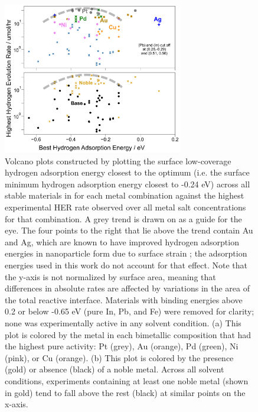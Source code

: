 \documentclass[preprint,12pt]{elsarticle}
\begin{document}
\begin{figure}[h]
\centering
    \includegraphics[width=0.7\textwidth]{figures/fig_4.pdf}
\caption{Volcano plots constructed by plotting the surface low-coverage hydrogen adsorption energy closest to the optimum (i.e. the surface minimum hydrogen adsorption energy closest to -0.24 eV) across all stable materials in for each metal combination against the highest experimental HER rate observed over all metal salt concentrations for that combination. A grey trend is drawn on as a guide for the eye. The four points to the right that lie above the trend contain Au and Ag, which are known to have improved hydrogen adsorption energies in nanoparticle form due to surface strain \cite{tran2018gold,campbell2009hydrogen}; the adsorption energies used in this work do not account for that effect. Note that the y-axis is not normalized by surface area, meaning that differences in absolute rates are affected by variations in the area of the total reactive interface. Materials with binding energies above 0.2 or below -0.65 eV (pure In, Pb, and Fe) were removed for clarity; none was experimentally active in any solvent condition. (a) This plot is colored by the metal in each bimetallic composition that had the highest pure activity: Pt (grey), Au (orange), Pd (green), Ni (pink), or Cu (orange). (b) This plot is colored by the presence (gold) or absence (black) of a noble metal. Across all solvent conditions, experiments containing at least one noble metal (shown in gold) tend to fall above the rest (black) at similar points on the x-axis.
}
\end{figure}
\end{document}
